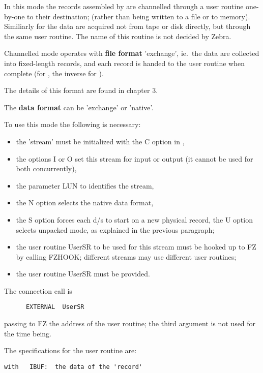 {In this mode the records assembled by  are channelled
through a user routine one-by-one to their destination;
(rather than being written to a file or to memory).
Similiarly for  the data are acquired not
from tape or disk directly, but through the same user routine.
The name of this routine is not decided by Zebra.

Channelled mode operates with
\textbf{file format} 'exchange',
ie.~the data are collected into fixed-length records,
and each record is handed to the user routine when complete
(for , the inverse for ).

The details of this format are found in chapter 3.

The \textbf{data format} can be 'exchange' or 'native'.

To use this mode the following is necessary:

\begin{itemize}
\item the 'stream' must be initialized with the C option in ,
\item the options I or O set this stream for input or output
      (it cannot be used for both concurrently),
\item the parameter LUN to  identifies the stream,
\item the N option selects the native data format,
\item the S option forces each d/s to start on a new
      physical record, the U option selects unpacked mode, as explained
      in the previous paragraph;
\item the user routine UserSR to be used for this stream
      must be hooked up to FZ by calling FZHOOK;
      different streams may use different user routines;
\item the user routine UserSR must be provided.
\end{itemize}

The connection call is
\begin{verbatim}
      EXTERNAL  UserSR
\end{verbatim}

passing to FZ the address of the user routine;
the third argument is not used for the time being.

The specifications for the user routine are:

\begin{verbatim}
with   IBUF:  the data of the 'record'


\end{verbatim}}

